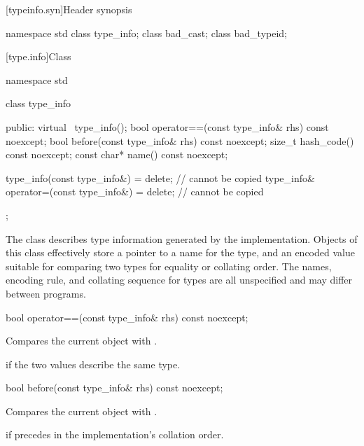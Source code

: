 [typeinfo.syn]{Header  synopsis}

%
%
%
\begin{codeblock}
namespace std {
  class type_info;
  class bad_cast;
  class bad_typeid;
}
\end{codeblock}

[type.info]{Class }

%
\begin{codeblock}
namespace std {
  class type_info {
  public:
    virtual ~type_info();
    bool operator==(const type_info& rhs) const noexcept;
    bool before(const type_info& rhs) const noexcept;
    size_t hash_code() const noexcept;
    const char* name() const noexcept;

    type_info(const type_info&) = delete;                   // cannot be copied
    type_info& operator=(const type_info&) = delete;        // cannot be copied
  };
}
\end{codeblock}

\pnum
The class
describes type information generated by the implementation.
Objects of this class effectively store a pointer to a name for the type, and
an encoded value suitable for comparing two types for equality or collating order.
The names, encoding rule, and collating sequence for types are all unspecified
%
and may differ between programs.

%
\begin{itemdecl}
bool operator==(const type_info& rhs) const noexcept;
\end{itemdecl}

\begin{itemdescr}
\pnum
\effects
Compares the current object with .

\pnum
\returns
{}
if the two values describe the same type.
\end{itemdescr}

%
\begin{itemdecl}
bool before(const type_info& rhs) const noexcept;
\end{itemdecl}

\begin{itemdescr}
\pnum
\effects
Compares the current object with .

\pnum
\returns
{}
if
precedes  in the implementation's collation order.
\end{itemdescr}

